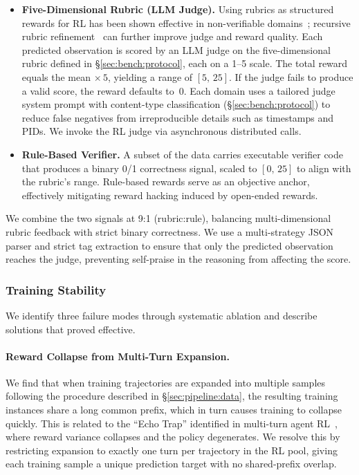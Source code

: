 \begin{itemize}[leftmargin=1.5em,itemsep=2pt]
    \item \textbf{Five-Dimensional Rubric (LLM Judge).}
    Using rubrics as structured rewards for RL has been shown effective in non-verifiable domains~\citep{gunjal2025rubrics}; recursive rubric refinement~\citep{shen2026rethinking} can further improve judge and reward quality.
    Each predicted observation is scored by an LLM judge on the five-dimensional rubric defined in \S\ref{sec:bench:protocol}, each on a 1--5 scale.
    The total reward equals the mean $\times\,5$, yielding a range of $[5,\,25]$.
    If the judge fails to produce a valid score, the reward defaults to~0.
    Each domain uses a tailored judge system prompt with content-type classification (\S\ref{sec:bench:protocol}) to reduce false negatives from irreproducible details such as timestamps and PIDs.
    We invoke the RL judge via asynchronous distributed calls.

    \item \textbf{Rule-Based Verifier.}
    A subset of the data carries executable verifier code that produces a binary 0/1 correctness signal, scaled to $[0,\,25]$ to align with the rubric's range.
    Rule-based rewards serve as an objective anchor, effectively mitigating reward hacking induced by open-ended rewards.

\end{itemize}

We combine the two signals at 9{:}1 (rubric{:}rule), balancing multi-dimensional rubric feedback with strict binary correctness.
We use a multi-strategy JSON parser and strict tag extraction to ensure that only the predicted observation reaches the judge, preventing self-praise in the reasoning from affecting the score.


\subsubsection{Training Stability}
\label{sec:pipeline:rl:stability}

We identify three failure modes through systematic ablation and describe solutions that proved effective.

\paragraph{Reward Collapse from Multi-Turn Expansion.}
We find that when training trajectories are expanded into multiple samples following the procedure described in \S\ref{sec:pipeline:data}, the resulting training instances share a long common prefix, which in turn causes training to collapse quickly.
This is related to the ``Echo Trap'' identified in multi-turn agent RL~\citep{wang2025ragen}, where reward variance collapses and the policy degenerates.
We resolve this by restricting expansion to exactly one turn per trajectory in the RL pool, giving each training sample a unique prediction target with no shared-prefix overlap.

